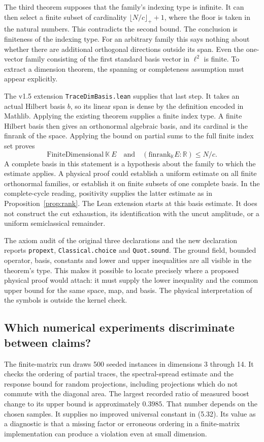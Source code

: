 \documentclass[11pt]{article}
\begin{document}
The third theorem supposes that the family's indexing type is infinite. It can then select a finite subset of cardinality $\lfloor N/c\rfloor_++1$, where the floor is taken in the natural numbers. This contradicts the second bound. The conclusion is finiteness of the indexing type. For an arbitrary family this says nothing about whether there are additional orthogonal directions outside its span. Even the one-vector family consisting of the first standard basis vector in $\ell^2$ is finite. To extract a dimension theorem, the spanning or completeness assumption must appear explicitly.

The v1.5 extension \texttt{TraceDimBasis.lean} supplies that last step. It takes an actual Hilbert basis $b$, so its linear span is dense by the definition encoded in Mathlib. Applying the existing theorem supplies a finite index type. A finite Hilbert basis then gives an orthonormal algebraic basis, and its cardinal is the finrank of the space. Applying the bound on partial sums to the full finite index set proves
\[
 \mathrm{FiniteDimensional}\ \mathbb K\ E
 \quad\text{and}\quad
       (\mathrm{finrank}_{\mathbb K}E:\mathbb R)\le N/c .
\]
A complete basis in this statement is a hypothesis about the family to which the estimate applies. A physical proof could establish a uniform estimate on all finite orthonormal families, or establish it on finite subsets of one complete basis. In the complete-cycle reading, positivity supplies the latter estimate as in Proposition~\ref{prop:rank}. The Lean extension starts at this basis estimate. It does not construct the cut exhaustion, its identification with the uncut amplitude, or a uniform semiclassical remainder.

The axiom audit of the original three declarations and the new declaration reports \texttt{propext}, \texttt{Classical.choice} and \texttt{Quot.sound}. The ground field, bounded operator, basis, constants and lower and upper inequalities are all visible in the theorem's type. This makes it possible to locate precisely where a proposed physical proof would attach: it must supply the lower inequality and the common upper bound for the same space, map, and basis. The physical interpretation of the symbols is outside the kernel check.

\subsection{Which numerical experiments discriminate between claims?}
The finite-matrix run draws 500 seeded instances in dimensions 3 through 14. It checks the ordering of partial traces, the spectral-spread estimate and the response bound for random projections, including projections which do not commute with the diagonal area. The largest recorded ratio of measured boost change to its upper bound is approximately $0.3985$. That number depends on the chosen samples. It supplies no improved universal constant in (5.32). Its value as a diagnostic is that a missing factor or erroneous ordering in a finite-matrix implementation can produce a violation even at small dimension.
\end{document}
